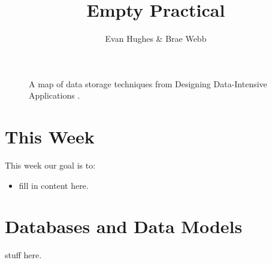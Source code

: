 \documentclass{csse4400}
\title{Empty Practical}
\author{Evan Hughes \& Brae Webb}
\date{\week{0}}
\begin{document}
\maketitle

\begin{figure}[h]
  \href{https://www.oreilly.com/library/view/designing-data-intensive-applications/9781491903063/ch02.html}{
  }
\caption{A map of data storage techniques from Designing Data-Intensive Applications \cite{data-intensive}.}
\end{figure}

\section{This Week}
This week our goal is to:
\begin{itemize}
  \item fill in content here.
\end{itemize}

\section{Databases and Data Models}
stuff here.





\end{document}
